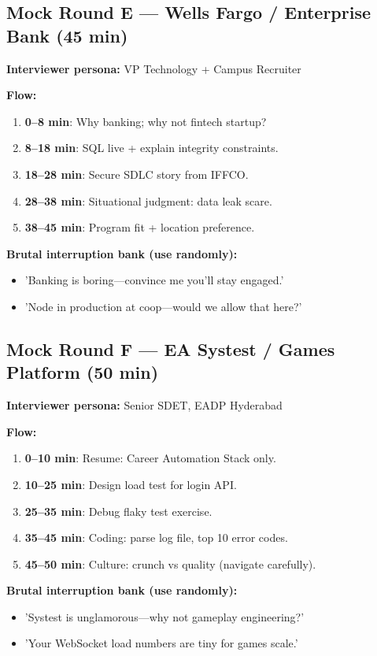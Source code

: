\documentclass[9pt,a4paper]{article}
\begin{document}
\subsection{Mock Round E --- Wells Fargo / Enterprise Bank (45 min)}
\textbf{Interviewer persona:} VP Technology + Campus Recruiter

\textbf{Flow:}
\begin{enumerate}
  \item \textbf{0--8 min}: Why banking; why not fintech startup?
  \item \textbf{8--18 min}: SQL live + explain integrity constraints.
  \item \textbf{18--28 min}: Secure SDLC story from IFFCO.
  \item \textbf{28--38 min}: Situational judgment: data leak scare.
  \item \textbf{38--45 min}: Program fit + location preference.
\end{enumerate}

\textbf{Brutal interruption bank (use randomly):}
\begin{itemize}
  \item 'Banking is boring---convince me you'll stay engaged.'
  \item 'Node in production at coop---would we allow that here?'
\end{itemize}

\subsection{Mock Round F --- EA Systest / Games Platform (50 min)}
\textbf{Interviewer persona:} Senior SDET, EADP Hyderabad

\textbf{Flow:}
\begin{enumerate}
  \item \textbf{0--10 min}: Resume: Career Automation Stack only.
  \item \textbf{10--25 min}: Design load test for login API.
  \item \textbf{25--35 min}: Debug flaky test exercise.
  \item \textbf{35--45 min}: Coding: parse log file, top 10 error codes.
  \item \textbf{45--50 min}: Culture: crunch vs quality (navigate carefully).
\end{enumerate}

\textbf{Brutal interruption bank (use randomly):}
\begin{itemize}
  \item 'Systest is unglamorous---why not gameplay engineering?'
  \item 'Your WebSocket load numbers are tiny for games scale.'
\end{itemize}
\end{document}
